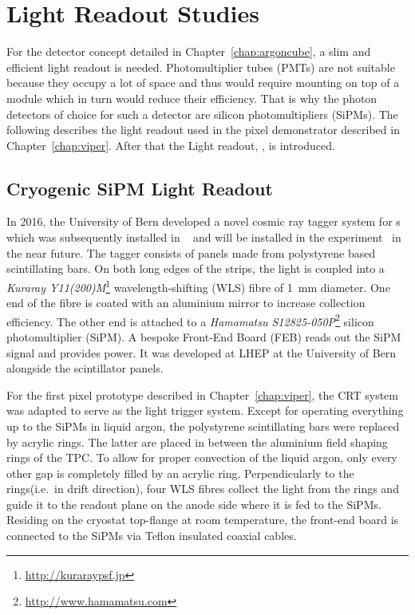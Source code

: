 \chapter{Light Readout Studies}
\label{chap:light-ro}

For the \AC{} detector concept detailed in Chapter~\ref{chap:argoncube}, a slim and efficient light readout is needed.
Photomultiplier tubes (PMTs) are not suitable because they occupy a lot of space and thus would require mounting on top of a module which in turn would reduce their efficiency.
That is why the photon detectors of choice for such a detector are silicon photomultipliers (SiPMs).
The following describes the light readout used in the \AC{} pixel demonstrator described in Chapter~\ref{chap:viper}.
After that the \AC{} Light readout, \AL{}, is introduced.


\section{Cryogenic SiPM Light Readout}
\label{sec:light-ro_viper}

In 2016, the University of Bern developed a novel cosmic ray tagger system for \lartpc{}s which was subsequently installed in \uboone{}~\cite{uboone} and will be installed in the \sbnd{} experiment~\cite{sbnd} in the near future.
The tagger consists of panels made from polystyrene based scintillating bars.
On both long edges of the strips, the light is coupled into a \emph{Kuraray Y11(200)M}\footnote{\url{http://kuraraypsf.jp}} wavelength-shifting (WLS) fibre of \SI{1}{\milli\metre} diameter.
One end of the fibre is coated with an aluminium mirror to increase collection efficiency.
The other end is attached to a \emph{Hamamatsu S12825-050P}\footnote{\url{http://www.hamamatsu.com}} silicon photomultiplier (SiPM).
A bespoke Front-End Board (FEB) reads out the SiPM signal and provides power.
It was developed at LHEP at the University of Bern alongside the scintillator panels\cite{crt_feb}.

For the first pixel prototype described in Chapter~\ref{chap:viper}, the CRT system was adapted to serve as the light trigger system.
Except for operating everything up to the SiPMs in liquid argon, the polystyrene scintillating bars were replaced by acrylic rings.
The latter are placed in between the aluminium field shaping rings of the TPC.
To allow for proper convection of the liquid argon, only every other gap is completely filled by an acrylic ring.
Perpendicularly to the rings(i.e.\ in drift direction), four WLS fibres collect the light from the rings and guide it to the readout plane on the anode side where it is fed to the SiPMs.
Residing on the cryostat top-flange at room temperature, the front-end board is connected to the SiPMs via Teflon insulated coaxial cables.

